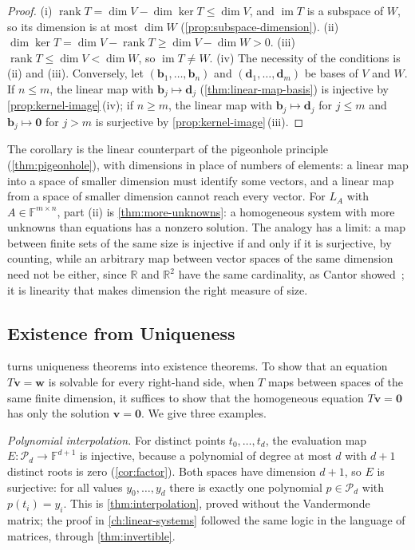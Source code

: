 \begin{proof}
(i) $\operatorname{rank}T=\dim V-\dim\ker T\le\dim V$, and $\operatorname{im}T$ is a subspace of $W$, so its dimension is at most $\dim W$ (\cref{prop:subspace-dimension}). (ii) $\dim\ker T=\dim V-\operatorname{rank}T\ge\dim V-\dim W>0$. (iii) $\operatorname{rank}T\le\dim V<\dim W$, so $\operatorname{im}T\ne W$. (iv) The necessity of the conditions is (ii) and (iii). Conversely, let $(\mathbf b_1,\ldots,\mathbf b_n)$ and $(\mathbf d_1,\ldots,\mathbf d_m)$ be bases of $V$ and $W$. If $n\le m$, the linear map with $\mathbf b_j\mapsto\mathbf d_j$ (\cref{thm:linear-map-basis}) is injective by \cref{prop:kernel-image}\,(iv); if $n\ge m$, the linear map with $\mathbf b_j\mapsto\mathbf d_j$ for $j\le m$ and $\mathbf b_j\mapsto\mathbf 0$ for $j>m$ is surjective by \cref{prop:kernel-image}\,(iii).
\end{proof}

The corollary is the linear counterpart of the pigeonhole principle (\cref{thm:pigeonhole}), with dimensions in place of numbers of elements: a linear map into a space of smaller dimension must identify some vectors, and a linear map from a space of smaller dimension cannot reach every vector. For $L_A$ with $A\in\mathbb F^{m\times n}$, part (ii) is \cref{thm:more-unknowns}: a homogeneous system with more unknowns than equations has a nonzero solution. The analogy has a limit: a map between finite sets of the same size is injective if and only if it is surjective, by counting, while an arbitrary map between vector spaces of the same dimension need not be either, since $\mathbb R$ and $\mathbb R^2$ have the same cardinality, as Cantor showed~\cite{cantor1878}; it is linearity that makes dimension the right measure of size.

\subsection{Existence from Uniqueness}
\label{sec:rank-nullity-applications}

 turns uniqueness theorems into existence theorems. To show that an equation $T\mathbf v=\mathbf w$ is solvable for every right-hand side, when $T$ maps between spaces of the same finite dimension, it suffices to show that the homogeneous equation $T\mathbf v=\mathbf 0$ has only the solution $\mathbf v=\mathbf 0$. We give three examples.

\emph{Polynomial interpolation.} For distinct points $t_0,\ldots,t_d$, the evaluation map $E\colon\mathcal P_d\to\mathbb F^{d+1}$ is injective, because a polynomial of degree at most $d$ with $d+1$ distinct roots is zero (\cref{cor:factor}). Both spaces have dimension $d+1$, so $E$ is surjective: for all values $y_0,\ldots,y_d$ there is exactly one polynomial $p\in\mathcal P_d$ with $p(t_i)=y_i$. This is \cref{thm:interpolation}, proved without the Vandermonde matrix; the proof in \cref{ch:linear-systems} followed the same logic in the language of matrices, through \cref{thm:invertible}.


